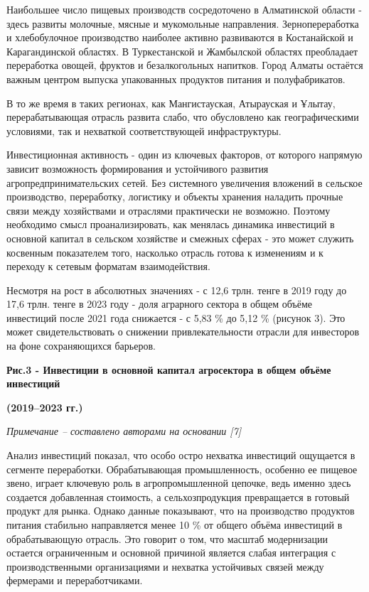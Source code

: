 Наибольшее число пищевых производств сосредоточено в Алматинской области
- здесь развиты молочные, мясные и мукомольные направления.
Зернопереработка и хлебобулочное производство наиболее активно
развиваются в Костанайской и Карагандинской областях. В Туркестанской и
Жамбылской областях преобладает переработка овощей, фруктов и
безалкогольных напитков. Город Алматы остаётся важным центром выпуска
упакованных продуктов питания и полуфабрикатов.

В то же время в таких регионах, как Мангистауская, Атырауская и Ұлытау,
перерабатывающая отрасль развита слабо, что обусловлено как
географическими условиями, так и нехваткой соответствующей
инфраструктуры.

Инвестиционная активность - один из ключевых факторов, от которого
напрямую зависит возможность формирования и устойчивого развития
агропредпринимательских сетей. Без системного увеличения вложений в
сельское производство, переработку, логистику и объекты хранения
наладить прочные связи между хозяйствами и отраслями практически не
возможно. Поэтому необходимо смысл проанализировать, как менялась
динамика инвестиций в основной капитал в сельском хозяйстве и смежных
сферах - это может служить косвенным показателем того, насколько отрасль
готова к изменениям и к переходу к сетевым форматам взаимодействия.

Несмотря на рост в абсолютных значениях - с 12,6 трлн. тенге в 2019 году
до 17,6 трлн. тенге в 2023 году - доля аграрного сектора в общем объёме
инвестиций после 2021 года снижается - с 5,83 \% до 5,12 \% (рисунок 3).
Это может свидетельствовать о снижении привлекательности отрасли для
инвесторов на фоне сохраняющихся барьеров.

{\bfseries Рис.3 - Инвестиции в основной капитал агросектора в общем
объёме инвестиций}

{\bfseries (2019--2023 гг.)}

\emph{Примечание -- составлено авторами на основании {[}7{]}}

Анализ инвестиций показал, что особо остро нехватка инвестиций ощущается
в сегменте переработки. Обрабатывающая промышленность, особенно ее
пищевое звено, играет ключевую роль в агропромышленной цепочке, ведь
именно здесь создается добавленная стоимость, а сельхозпродукция
превращается в готовый продукт для рынка. Однако данные показывают, что
на производство продуктов питания стабильно направляется менее 10 \% от
общего объёма инвестиций в обрабатывающую отрасль. Это говорит о том,
что масштаб модернизации остается ограниченным и основной причиной
является слабая интеграция с производственными организациями и нехватка
устойчивых связей между фермерами и переработчиками.

